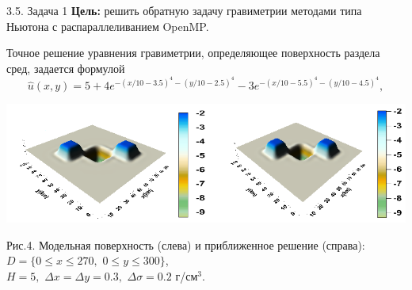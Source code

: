 \documentclass[10pt,pdf, mathserif, hyperref={unicode}]{beamer}
\begin{document}
\begin{frame}{\small 3.5. Задача 1}
	\textbf{\color{blue}Цель:} решить обратную задачу гравиметрии методами типа Ньютона с распараллеливанием OpenMP.
	
	Точное решение уравнения гравиметрии, определяющее поверхность раздела сред, задается формулой
	$$\hat{u}(x,y)=5+4e^{-(x/10-3.5)^4-(y/10-2.5)^4}-3e^{-(x/10-5.5)^4-(y/10-4.5)^4},$$
	\centering
		
	\includegraphics[width=\textwidth, height=0.35\textheight]{gravy_kiev2014.png}
	
	Рис.4. Модельная поверхность (слева) и приближенное решение (справа): $D=\{0\le x\le 270, \,\,0\le y\le 300\}$, \\ $  H=5,\,\,\Delta x=\Delta y=0.3,\,\,\Delta\sigma=0.2$ г/см$^3$.
\end{frame}
\end{document}
